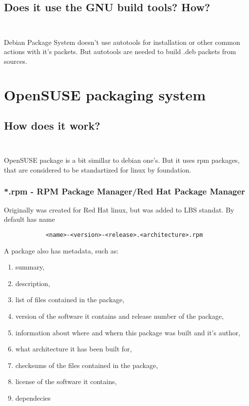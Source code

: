 \documentclass[10pt]{article}
\begin{document}
    \subsection {Does it use the GNU build tools? How? \\ \\}
    Debian Package System doesn't use autotools for installation or other common actions with it's packets. But autotools are needed to build .deb packets from sources.



\section{OpenSUSE packaging system    \newline}

    \subsection {How does it work? \\ \\}
        OpenSUSE package is a bit simillar to debian one's. But it uses rpm packages, that are considered to be standartized for linux by foundation.\newline \newline
        
        \subsubsection*{*.rpm - RPM Package Manager/Red Hat Package Manager}
            Originally was created for Red Hat linux, but was added to LBS standat. By default has name 
            \begin{verbatim}
            <name>-<version>-<release>.<architecture>.rpm
            \end{verbatim}
                A package also has metadata, such as:
                \begin{enumerate}
                    \item summary,
                    \item description,
                    \item list of files contained in the package,
                    \item version of the software it contains and release number of the package,
                    \item information about where and whern this package was built and it's author,
                    \item what architecture it has been built for,
                    \item checksums of the files contained in the package,
                    \item license of the software it contains,
                    \item dependecies
                \end{enumerate}
\end{document}
